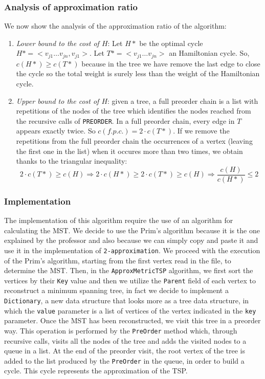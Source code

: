 \subsubsection{Analysis of approximation ratio}
We now show the analysis of the approximation ratio of the algorithm:
\begin{enumerate}
    \item \textit{Lower bound to the cost of $H$}: Let $H*$ be the optimal cycle $H* = <v_{j1} \dots v_{jn}, v_{j1}>$. Let $T* = <v_{j1} \dots v_{jn}>$ an Hamiltonian cycle. So, $c(H*) \ge c(T*)$ because in the tree we have remove the last edge to close the cycle so the total weight is surely less than the weight of the Hamiltonian cycle.
    \item \textit{Upper bound to the cost of $H$}: given a tree, a full preorder chain is a list with repetitions of the nodes of the tree which identifies the nodes reached from the recursive calls of \verb|PREORDER|. In a full preorder chain, every edge in $T$ appears exactly twice. So $c(f.p.c.) = 2 \cdot c(T*)$. If we remove the repetitions from the full preorder chain the occurrences of a vertex (leaving the first one in the list) when it occures more than two times, we obtain thanks to the triangular inequality:
    \[
        2 \cdot c(T*) \ge c(H) \Rightarrow 2 \cdot c(H*) \ge 2 \cdot c(T*) \ge c(H)
        \Rightarrow \frac{c(H)}{c(H*)} \le 2
    \]
\end{enumerate}

\subsubsection{Implementation}
The implementation of this algorithm require the use of an algorithm for calculating the MST. We decide to use the Prim's algorithm because it is the one explained by the professor and also because we can simply copy and paste it and use it in the implementation of \verb|2-approximation|. We proceed with the execution of the Prim's algorithm, starting from the first vertex read in the file, to determine the MST. Then, in the \verb|ApproxMetricTSP| algorithm, we first sort the vertices by their \verb|Key| value and then we utilize the \verb|Parent| field of each vertex to reconstruct a minimum spanning tree, in fact we decide to implement a \verb|Dictionary|, a new data structure that looks more as a tree data structure, in which the \verb|value| parameter is a list of vertices of the vertex indicated in the \verb|key| parameter. Once the MST has been reconstructed, we visit this tree in a preorder way. This operation is performed by the \verb|PreOrder| method which, through recursive calls, visits all the nodes of the tree and adds the visited nodes to a queue in a list. At the end of the preorder visit, the root vertex of the tree is added to the list produced by the \verb|PreOrder| in the queue, in order to build a cycle. This cycle represents the approximation of the TSP.


